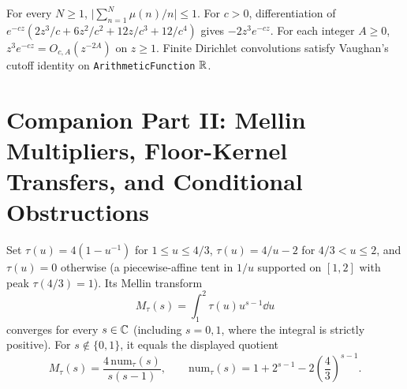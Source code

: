 \begin{theorem}
\label{thm:mobius-tail}
\leanok
For every $N \ge 1$, $\bigl|\sum_{n=1}^N \mu(n)/n\bigr| \le 1$. For $c > 0$, differentiation of $e^{-cz}(2z^3/c + 6z^2/c^2 + 12z/c^3 + 12/c^4)$ gives $-2z^3 e^{-cz}$. For each integer $A \ge 0$, $z^3 e^{-cz} = O_{c,A}(z^{-2A})$ on $z \ge 1$. Finite Dirichlet convolutions satisfy Vaughan's cutoff identity on \texttt{ArithmeticFunction} $\mathbb{R}$.
\end{theorem}

\section{Companion Part II: Mellin Multipliers, Floor-Kernel Transfers, and Conditional Obstructions}
\label{sec:companion-mellin}

\begin{definition}
\label{def:tent-mellin}
\leanok
Set $\tau(u) = 4(1 - u^{-1})$ for $1 \le u \le 4/3$, $\tau(u) = 4/u - 2$ for $4/3 < u \le 2$, and $\tau(u) = 0$ otherwise (a piecewise-affine tent in $1/u$ supported on $[1, 2]$ with peak $\tau(4/3) = 1$). Its Mellin transform
\[
  M_\tau(s) = \int_1^2 \tau(u) u^{s-1}\dd u
\]
converges for every $s \in \mathbb{C}$ (including $s = 0, 1$, where the integral is strictly positive). For $s \notin \{0, 1\}$, it equals the displayed quotient
\[
  M_\tau(s) = \frac{4\,\mathrm{num}_\tau(s)}{s(s-1)}, \qquad
  \mathrm{num}_\tau(s) = 1 + 2^{s-1} - 2\left(\frac{4}{3}\right)^{s-1}.
\]
\end{definition}

